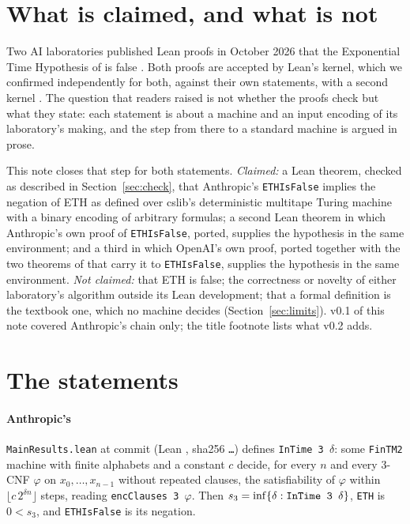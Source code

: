 \documentclass[preprint,11pt,authoryear,a4paper]{elsarticle}
\newcommand{\lean}[1]{\texttt{#1}}
\begin{document}
\section{What is claimed, and what is not}\label{sec:claim}

Two AI laboratories published Lean proofs in October 2026 that the Exponential Time Hypothesis of \citet{IP01} is false \citep{AnthropicETH,OpenAIETH}. Both proofs are accepted by Lean's kernel, which we confirmed independently for both, against their own statements, with a second kernel \citep{CMEth}. The question that readers raised is not whether the proofs check but what they state: each statement is about a machine and an input encoding of its laboratory's making, and the step from there to a standard machine is argued in prose.

This note closes that step for both statements. \emph{Claimed:} a Lean theorem, checked as described in Section~\ref{sec:check}, that Anthropic's \lean{ETHIsFalse} implies the negation of ETH as defined over cslib's deterministic multitape Turing machine with a binary encoding of arbitrary formulas; a second Lean theorem in which Anthropic's own proof of \lean{ETHIsFalse}, ported, supplies the hypothesis in the same environment; and a third in which OpenAI's own proof, ported together with the two theorems of \citet{Hawkley26} that carry it to \lean{ETHIsFalse}, supplies the hypothesis in the same environment. \emph{Not claimed:} that ETH is false; the correctness or novelty of either laboratory's algorithm outside its Lean development; that a formal definition is the textbook one, which no machine decides (Section~\ref{sec:limits}). v0.1 of this note covered Anthropic's chain only; the title footnote lists what v0.2 adds.

\section{The statements}\label{sec:defs}

\paragraph{Anthropic's} \lean{MainResults.lean} at commit \EcAnthropicCommit{} (Lean \EcAnthropicLean, sha256 \texttt{\EcMainResultsSha\dots}) defines \lean{InTime 3 $\delta$}: some \lean{FinTM2} machine with finite alphabets and a constant $c$ decide, for every $n$ and every 3-CNF $\varphi$ on $x_0,\dots,x_{n-1}$ without repeated clauses, the satisfiability of $\varphi$ within $\lfloor c\,2^{\delta n}\rfloor$ steps, reading \lean{encClauses 3 $\varphi$}. Then $s_3=\inf\{\delta: \text{\lean{InTime 3 $\delta$}}\}$, \lean{ETH} is $0<s_3$, and \lean{ETHIsFalse} is its negation.
\end{document}
